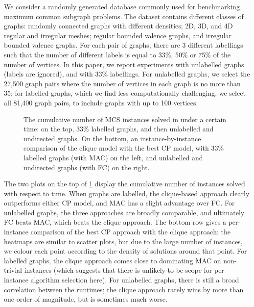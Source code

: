\documentclass{llncs}
\begin{document}
We consider a randomly generated database
\cite{DBLP:journals/prl/SantoFSV03,DBLP:journals/jgaa/ConteFV07} commonly used for benchmarking
maximum common subgraph problems.  The dataset contains different classes of graphs: randomly
connected graphs with different densities; 2D, 3D, and 4D regular and irregular meshes; regular
bounded valence graphs, and irregular bounded valence graphs.  For each pair of graphs, there are 3
different labellings such that the number of different labels is equal to 33\%, 50\% or 75\% of the
number of vertices. In this paper, we report experiments with unlabelled graphs (labels are
ignored), and with 33\% labellings. For unlabelled graphs, we select the 27,500 graph pairs where the
number of vertices in each graph is no more than 35; for labelled graphs, which we find less
computationally challenging, we select all 81,400 graph pairs, to include graphs with up to 100
vertices.

\begin{figure}[tb]
    \centering
    
    \vspace*{1em}

    \centering
    
    \caption{The cumulative number of MCS instances solved in under a certain time: on the top, 33\%
        labelled graphs, and then unlabelled and undirected graphs. On the bottom, an
        instance-by-instance comparison of the clique model with the best CP model, with 33\%
        labelled graphs (with MAC) on the left, and unlabelled and undirected graphs (with FC) on
    the right.} \label{figure:unconnected-cumulative}
\end{figure}

The two plots on the top of \cref{figure:unconnected-cumulative} display the cumulative number of instances
solved with respect to time.  When graphs are labelled, the clique-based approach clearly
outperforms either CP model, and MAC has a slight advantage over FC. For unlabelled graphs, the
three approaches are broadly comparable, and ultimately FC beats MAC, which beats the clique
approach. The bottom row gives a per-instance comparison of the best CP approach with the clique
approach: the heatmaps are similar to scatter plots, but due to the large number of instances, we
colour each point according to the density of solutions around that point. For labelled graphs, the
clique approach comes close to dominating MAC on non-trivial instances (which suggests that there is
unlikely to be scope for per-instance algorithm selection here). For unlabelled graphs, there is
still a broad correlation between the runtimes; the clique approach rarely wins by more than one
order of magnitude, but is sometimes much worse.
\end{document}
